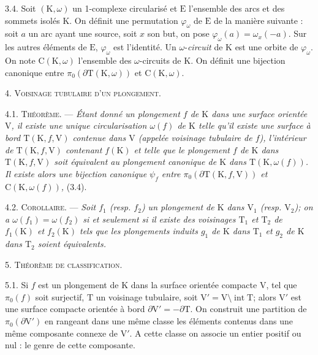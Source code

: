 3.4. Soit \((\mathrm{K},\omega)\) un 1-complexe circularisé et \(\mathrm{E}\) l'ensemble des arcs et des sommets isolés \(\mathrm{K}\). On définit une permutation \(\varphi_\omega\) de \(\mathrm{E}\) de la manière suivante : soit \(a\) un arc ayant une source, soit \(x\) son but, on pose \(\varphi_\omega(a)=\omega_x(-a)\). Sur les autres éléments de \(\mathrm{E}\), \(\varphi_\omega\) est l'identité. Un \(\omega\)-\textit{circuit} de \(\mathrm{K}\) est une orbite de \(\varphi_\omega\). On note \(\mathrm{C}(\mathrm{K},\omega)\) l'ensemble des \(\omega\)-circuits de \(\mathrm{K}\). On définit une bijection canonique entre \(\pi_0(\partial\mathrm{T}(\mathrm{K},\omega))\) et \(\mathrm{C}(\mathrm{K},\omega)\).

4. \textsc{Voisinage tubulaire d'un plongement.}

4.1. \textsc{Théorème.} --- \textit{Étant donné un plongement \(f\) de \(\mathrm{K}\) dans une surface orientée \(\mathrm{V}\), il existe une unique circularisation \(\omega(f)\) de \(\mathrm{K}\) telle qu'il existe une surface à bord \(\mathrm{T}(\mathrm{K},f,\mathrm{V})\) contenue dans \(\mathrm{V}\) (appelée \textup{voisinage tubulaire de} \(f\)), l'intérieur de \(\mathrm{T}(\mathrm{K},f,\mathrm{V})\) contenant \(f(\mathrm{K})\) et telle que le plongement \(f\) de \(\mathrm{K}\) dans \(\mathrm{T}(\mathrm{K},f,\mathrm{V})\) soit équivalent au plongement canonique de \(\mathrm{K}\) dans \(\mathrm{T}(\mathrm{K},\omega(f))\). Il existe alors une bijection canonique \(\psi_f\) entre \(\pi_0(\partial\mathrm{T}(\mathrm{K},f,\mathrm{V}))\) et \(\mathrm{C}(\mathrm{K},\omega(f))\),} (3.4).

4.2. \textsc{Corollaire.} --- \textit{Soit \(f_1\) (resp. \(f_2\)) un plongement de \(\mathrm{K}\) dans \(\mathrm{V}_1\) (resp. \(\mathrm{V}_2\)); on a \(\omega(f_1)=\omega(f_2)\) si et seulement si il existe des voisinages \(\mathrm{T}_1\) et \(\mathrm{T}_2\) de \(f_1(\mathrm{K})\) et \(f_2(\mathrm{K})\) tels que les plongements induits \(g_1\) de \(\mathrm{K}\) dans \(\mathrm{T}_1\) et \(g_2\) de \(\mathrm{K}\) dans \(\mathrm{T}_2\) soient équivalents.}

5. \textsc{Théorème de classification.}

5.1. Si \(f\) est un plongement de \(\mathrm{K}\) dans la surface orientée compacte \(\mathrm{V}\), tel que \(\pi_0(f)\) soit surjectif, \(\mathrm{T}\) un voisinage tubulaire, soit \(\mathrm{V}'=\mathrm{V}\setminus\operatorname{int}\mathrm{T}\); alors \(\mathrm{V}'\) est une surface compacte orientée à bord \(\partial\mathrm{V}'=-\partial\mathrm{T}\). On construit une partition de \(\pi_0(\partial\mathrm{V}')\) en rangeant dans une même classe les éléments contenus dans une même composante connexe de \(\mathrm{V}'\). A cette classe on associe un entier positif ou nul : le genre de cette composante.

